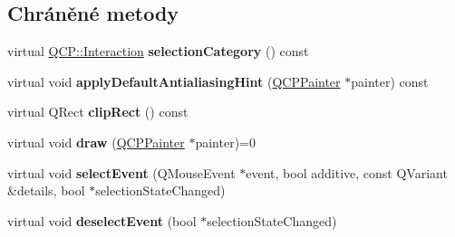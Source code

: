 \subsection*{Chráněné metody}
\begin{DoxyCompactItemize}
\item 
\hypertarget{classQCPAbstractLegendItem_a53a80054ab329beaca072fb08c08944b}{}virtual \hyperlink{namespaceQCP_a2ad6bb6281c7c2d593d4277b44c2b037}{Q\+C\+P\+::\+Interaction} {\bfseries selection\+Category} () const \label{classQCPAbstractLegendItem_a53a80054ab329beaca072fb08c08944b}

\item 
\hypertarget{classQCPAbstractLegendItem_a71c3baeda42ba78d2cccd97e74110a5e}{}virtual void {\bfseries apply\+Default\+Antialiasing\+Hint} (\hyperlink{classQCPPainter}{Q\+C\+P\+Painter} $\ast$painter) const \label{classQCPAbstractLegendItem_a71c3baeda42ba78d2cccd97e74110a5e}

\item 
\hypertarget{classQCPAbstractLegendItem_abcb540c331b49ef7ee0ea1abbd0dcac3}{}virtual Q\+Rect {\bfseries clip\+Rect} () const \label{classQCPAbstractLegendItem_abcb540c331b49ef7ee0ea1abbd0dcac3}

\item 
\hypertarget{classQCPAbstractLegendItem_a97dedc084c672359710f16b31d046d1d}{}virtual void {\bfseries draw} (\hyperlink{classQCPPainter}{Q\+C\+P\+Painter} $\ast$painter)=0\label{classQCPAbstractLegendItem_a97dedc084c672359710f16b31d046d1d}

\item 
\hypertarget{classQCPAbstractLegendItem_abcfe9e335d99c7fac74e03d26723c1b7}{}virtual void {\bfseries select\+Event} (Q\+Mouse\+Event $\ast$event, bool additive, const Q\+Variant \&details, bool $\ast$selection\+State\+Changed)\label{classQCPAbstractLegendItem_abcfe9e335d99c7fac74e03d26723c1b7}

\item 
\hypertarget{classQCPAbstractLegendItem_ae64e667e7c5b85cd92c9b91928faef28}{}virtual void {\bfseries deselect\+Event} (bool $\ast$selection\+State\+Changed)\label{classQCPAbstractLegendItem_ae64e667e7c5b85cd92c9b91928faef28}

\end{DoxyCompactItemize}
